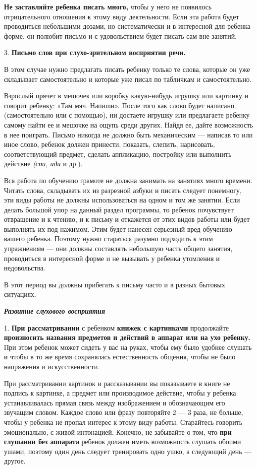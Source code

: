 \documentclass{book}
\renewcommand{\emph}[1]{\textit{#1}}
\begin{document}
\textbf{Не заставляйте ребенка писать много,} чтобы у него не появилось
отрицательного отношения к этому виду деятельности. Если эта работа
будет проводиться небольшими дозами, но систематически и в интересной
для ребенка форме, он полюбит письмо и с удовольствием будет писать сам
вне занятий.

3. \textbf{Письмо слов при слухо-зрительном восприятии речи.}

В этом случае нужно предлагать писать ребенку только те слова, которые
он уже складывает самостоятельно и которые уже писал по табличкам и
самостоятельно.

Взрослый прячет в мешочек или коробку какую-нибудь игрушку или картинку
и говорит ребенку: «Там мяч. Напиши». После того как слово будет
написано (самостоятельно или с помощью), ни достаете игрушку или
предлагаете ребенку самому найти ее и мешочке на ощупь среди других.
Найдя ее, дайте возможность в нее поиграть. Письмо никогда не должно
быть механическим --- написав то или иное слово, ребенок должен
принести, показать, слепить, нарисовать, соответствующий предмет,
сделать аппликацию, постройку или выполнить действие \emph{(спи, иди} и
др.).

Вся работа по обучению грамоте не должна занимать на занятиях много
времени. Читать слова, складывать их из разрезной азбуки и писать
следует понемногу, эти виды работы не должны использоваться на одном и
том же занятии. Если делать большой упор на данный раздел программы, то
ребенок почувствует отвращение и к чтению, и к письму и откажется от
этих видов работы или будет выполнять их под нажимом. Этим будет нанесен
серьезный вред обучению вашего ребенка. Поэтому нужно стараться разумно
подходить к этим упражнениям --- они должны составлять небольшую часть
общего занятия, проводиться в интересной форме и не вызывать у ребенка
утомления и недовольства.

В этот период вы должны прибегать к письму часто и в разных бытовых
ситуациях.

\emph{\textbf{Развитие слухового восприятия}}

1. \textbf{При рассматривании} с ребенком \textbf{книжек с картинками}
продолжайте \textbf{произносить названия предметов и действий в аппарат
или на ухо ребенку.} При этом ребенок может сидеть у вас на руках, чтобы
ему было удобнее слушать и чтобы в то же время сохранялась
естественность общения, чтобы не было напряжения и искусственности.

При рассматривании картинок и рассказывании вы показываете в книге не
подпись к картинке, а предмет или производимое действие, чтобы у ребенка
устанавливалась прямая связь между изображением и обозначающим его
звучащим словом. Каждое слово или фразу повторяйте 2 --- 3 раза, не
больше, чтобы у ребенка не пропал интерес к этому виду работы.
Старайтесь говорить эмоционально, с живой интонацией. Конечно, не
забывайте о том, что \textbf{при слушании без аппарата} ребенок должен
иметь возможность слушать обоими ушами, поэтому один день следует
тренировать одно ушко, а следующий день --- другое.
\end{document}
